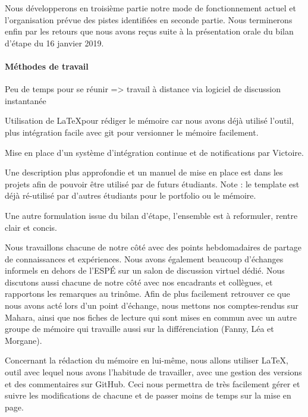 Nous développerons en troisième partie notre mode de fonctionnement actuel et l’organisation prévue des pistes identifiées en seconde partie.
Nous terminerons enfin par les retours que nous avons reçus suite à la présentation orale du bilan d’étape du 16 janvier 2019.

\paragraph{Méthodes de travail}

Peu de temps pour se réunir => travail à distance via logiciel de discussion instantanée

Utilisation de \LaTeX pour rédiger le mémoire car nous avons déjà utilisé l'outil,
plus intégration facile avec git pour versionner le mémoire facilement.

Mise en place d'un système d'intégration continue et de notifications par Victoire.

Une description plus approfondie et un manuel de mise en place est dans les projets
afin de pouvoir être utilisé par de futurs étudiants. Note : le template est déjà ré-utilisé par d'autres étudiants pour le portfolio ou le mémoire.

{\color{red}Une autre formulation issue du bilan d'étape, l'ensemble est à reformuler, rentre clair et concis.}

Nous travaillons chacune de notre côté avec des points hebdomadaires de partage de connaissances et expériences. Nous avons également beaucoup d’échanges informels en dehors de l’ESPÉ sur un salon de discussion virtuel dédié. Nous discutons aussi chacune de notre côté avec nos encadrants et collègues, et rapportons les remarques au trinôme.
Afin de plus facilement retrouver ce que nous avons acté lors d’un point d’échange, nous mettons nos comptes-rendus sur Mahara, ainsi que nos fiches de lecture qui sont mises en commun avec un autre groupe de mémoire qui travaille aussi sur la différenciation (Fanny, Léa et Morgane).

Concernant la rédaction du mémoire en lui-même, nous allons utiliser LaTeX, outil avec lequel nous avons l’habitude de travailler, avec une gestion des versions et des commentaires sur GitHub. Ceci nous permettra de très facilement gérer et suivre les modifications de chacune et de passer moins de temps sur la mise en page.

